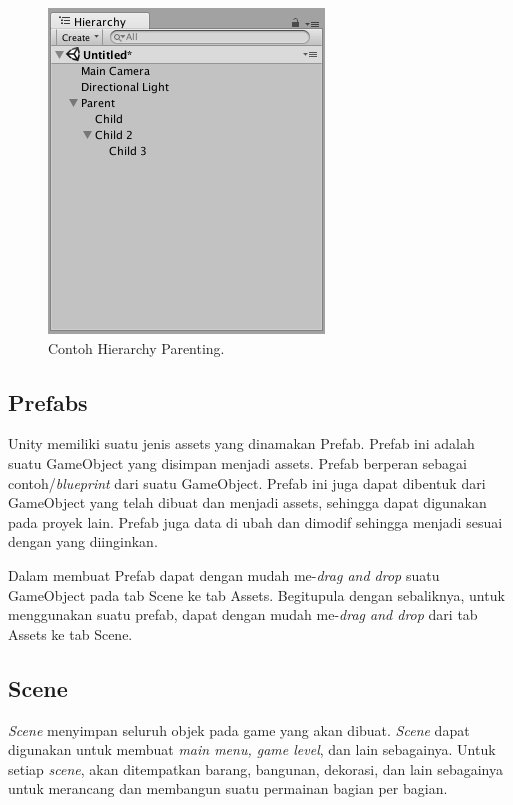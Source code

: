  
\begin{figure}[htbp]
\centering
\includegraphics[scale=0.7]{Gambar/hierarchy-parenting.png}
\caption{Contoh Hierarchy Parenting.} 
\label{fig:contoh-hierarchy-parenting}
\end{figure}

\subsection{Prefabs}
\label{ssec:prefabs}

Unity memiliki suatu jenis assets yang dinamakan Prefab. Prefab ini adalah suatu GameObject yang disimpan menjadi assets. Prefab berperan sebagai contoh/\textit{blueprint} dari suatu GameObject. Prefab ini juga dapat dibentuk dari GameObject yang telah dibuat dan menjadi assets, sehingga dapat digunakan pada proyek lain. Prefab juga data di ubah dan dimodif sehingga menjadi sesuai dengan yang diinginkan. 

Dalam membuat Prefab dapat dengan mudah me-\textit{drag and drop} suatu GameObject pada tab Scene ke tab Assets. Begitupula dengan sebaliknya, untuk menggunakan suatu prefab, dapat dengan mudah me-\textit{drag and drop} dari tab Assets ke tab Scene. 

\subsection{Scene}
\label{ssec:scene}

\textit{Scene} menyimpan seluruh objek pada game yang akan dibuat. \textit{Scene} dapat digunakan untuk membuat \textit{main menu, game level}, dan lain sebagainya. Untuk setiap \textit{scene}, akan ditempatkan barang, bangunan, dekorasi, dan lain sebagainya untuk merancang dan membangun suatu permainan bagian per bagian.  


